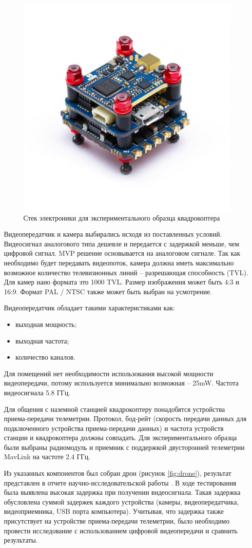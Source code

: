 \begin{figure}[H]
	\centering
	\includegraphics[width=0.5\linewidth]{../RW/pics/stack}
	\caption{Стек электроники для экспериментального образца квадрокоптера
	}
	\label{fig:stack} %
\end{figure}

Видеопередатчик и камера выбирались исходя из поставленных условий. Видеосигнал аналогового типа дешевле и передается с задержкой меньше, чем цифровой сигнал. MVP решение основывается на аналоговом сигнале. Так как необходимо будет передавать видеопоток, камера должна иметь максимально возможное количество телевизионных линий -- разрешающая способность (TVL). Для камер нано формата это 1000 TVL. Размер изображения может быть 4:3 и 16:9. Формат PAL / NTSC также может быть выбран на усмотрение.

Видеопередатчик обладает такими характеристиками как:
\begin{itemize}
	\item выходная мощность;
	\item выходная частота;
	\item количество каналов.
\end{itemize}

Для помещений нет необходимости использования высокой мощности видеопередачи, потому используется минимально возможная -- 25mW. Частота видеосигнала 5.8 ГГц.

Для общения с наземной станцией квадрокоптеру понадобятся устройства приема-передачи телеметрии. Протокол, бод-рейт (скорость передачи данных для подключенного устройства приема-передачи данных) и частота устройств станции и квадрокоптера должны совпадать. Для экспериментального образца были выбраны радиомодуль и приемник с поддержкой двусторонней телеметрии MavLink на частоте 2.4 ГГц.

Из указанных компонентов был собран дрон (рисунок \ref{fig:drone}), результат представлен в отчете научно-исследовательской работы \cite{nir1}. В ходе тестирования была выявлена высокая задержка при получении видеосигнала. Такая задержка обусловлена суммой задержек каждого устройства (камеры, видеопередатчика, видеоприемника, USB порта компьютера). Учитывая, что задержка также присутствует на устройстве приема-передачи телеметрии, было необходимо провести исследование с использованием цифровой видеопередачи и сравнить результаты. 

